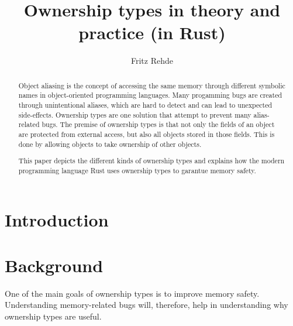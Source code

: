 \documentclass[sigplan,11pt,nonacm]{acmart}
\begin{document}
\title{Ownership types in theory and practice (in Rust)}
\author{Fritz Rehde}

\begin{abstract}


Object aliasing is the concept of accessing the same memory through different symbolic names in object-oriented programming languages.
Many progamming bugs are created through unintentional aliases, which are hard to detect and can lead to unexpected side-effects.
Ownership types are one solution that attempt to prevent many alias-related bugs.
The premise of ownership types is that not only the fields of an object are protected from external access, but also all objects stored in those fields.
This is done by allowing objects to take ownership of other objects.

This paper depicts the different kinds of ownership types and explains how the modern programming language Rust uses ownership types to garantue memory safety.

\end{abstract}


\maketitle

\section{Introduction}
\label{sec:introduction}


\section{Background}
\label{sec:background}

One of the main goals of ownership types is to improve memory safety.
Understanding memory-related bugs will, therefore, help in understanding why ownership types are useful.
\end{document}

